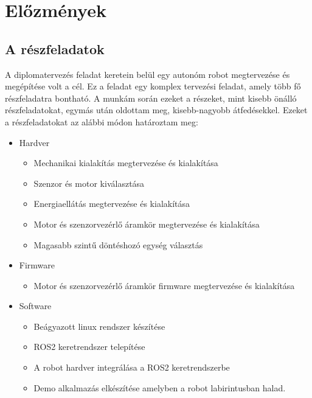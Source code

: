\chapter{Előzmények}

\section{A részfeladatok}

A diplomatervezés feladat keretein belül egy autonóm robot megtervezése és
megépítése volt a cél. Ez a feladat egy komplex tervezési feladat, amely több fő
részfeladatra bontható. A munkám során ezeket a részeket, mint kisebb önálló
részfeladatokat, egymás után oldottam meg, kisebb-nagyobb átfedésekkel. Ezeket a
részfeladatokat az alábbi módon határoztam meg:

\begin{itemize}
\item Hardver
  \begin{itemize}
  \item Mechanikai kialakítás megtervezése és kialakítása
  \item Szenzor és motor kiválasztása
  \item Energiaellátás megtervezése és kialakítása
  \item Motor és szenzorvezérlő áramkör megtervezése és kialakítása
  \item Magasabb szintű döntéshozó egység választás
  \end{itemize}
\item{Firmware}
  \begin{itemize}
  \item Motor és szenzorvezérlő áramkör firmware megtervezése és kialakítása
  \end{itemize}
\item{Software}
  \begin{itemize}
  \item Beágyazott linux rendszer készítése
  \item ROS2 keretrendszer telepítése
  \item A robot hardver integrálása a ROS2 keretrendszerbe
  \item Demo alkalmazás elkészítése amelyben a robot labirintusban halad.
  \end{itemize}
\end{itemize}

